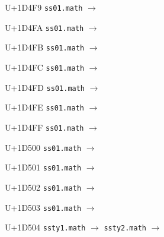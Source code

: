 \documentclass{article}
\begin{document}
\begin{substitutions}
\goodbreak

U+1D4F9  \linebreak
    \texttt{ss01.math} $\to$  

\goodbreak

U+1D4FA  \linebreak
    \texttt{ss01.math} $\to$  

\goodbreak

U+1D4FB  \linebreak
    \texttt{ss01.math} $\to$  

\goodbreak

U+1D4FC  \linebreak
    \texttt{ss01.math} $\to$  

\goodbreak

U+1D4FD  \linebreak
    \texttt{ss01.math} $\to$  

\goodbreak

U+1D4FE  \linebreak
    \texttt{ss01.math} $\to$  

\goodbreak

U+1D4FF  \linebreak
    \texttt{ss01.math} $\to$  

\goodbreak

U+1D500  \linebreak
    \texttt{ss01.math} $\to$  

\goodbreak

U+1D501  \linebreak
    \texttt{ss01.math} $\to$  

\goodbreak

U+1D502  \linebreak
    \texttt{ss01.math} $\to$  

\goodbreak

U+1D503  \linebreak
    \texttt{ss01.math} $\to$  

\goodbreak

U+1D504  \linebreak
    \texttt{ssty1.math} $\to$  \linebreak
    \texttt{ssty2.math} $\to$  


\end{substitutions}
\end{document}
